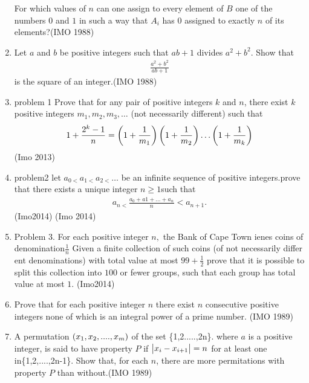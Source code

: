 \begin{enumerate}
                 For which values of $n$ can one assign to every element of $B$ one of the numbers $0$ and $1$ in such a way that $A_i$ has $0$ assigned to exactly $n$ of its elements?\hfill(IMO 1988)
\item Let $a$ and $b$ be positive integers such that $ab + 1$ divides $a^2 + b^2$. Show that 
               \begin{align*} \frac{a^2+b^2}{ab+1} \end{align*} is the square of an integer.\hfill(IMO 1988)
               \item problem 1 Prove that for any pair of positive integers $k$ and $n$, there exist $k$ positive integers $m_1,m_2,m_3,\ldots$
 (not necessarily different) such that
\begin{align}
	1+\frac{2^{k}-1}{n}=\left(1+\frac{1}{m_1}\right)\left(1+\frac{1}{m_2}\right)\ldots\left(1+\frac{1}{m_k}\right)
\end{align}  \hfill(Imo 2013)
 \item problem2 let $a_{0<} a_{1<} a_{2 <} \ldots$ be an infinite sequence of positive integers.prove that there exists a unique integer $n    \geq 1$such that          \begin{align}                                                                                                                                                                             a_{n< }\frac{a_0+a1+\ldots+a_n}{n} < a_{n+1}.                                                                                                                \end{align} \hfill(Imo2014) \hfill(Imo 2014)   
\item Problem 3. For each positive integer $n,$ the Bank of Cape Town ienes coins of denomination$\frac{1}{n}$ Given a finite collection of such coins (of  not  necessarily  differ
    ent  denominations) with total value at most $99 +\frac{1}{2}$ prove that it is possible to split this collection into $100$ or fewer groups, such that each group has total value at most $1$. \hfill(Imo2014)
    \item Prove that for each positive integer $n$ there exist $n$ consecutive positive integers none of which is an integral power of a prime number. \hfill(IMO 1989)

	\item A permutation $\left(x_1,x_2,....,x_m\right)$ of the set \{1,2.....,2n\}. where $a$ is a positive integer, is said to have property $P$ if $\begin{vmatrix}x_i - x_{i+1}\end{vmatrix} = n $ for at least one in\{1,2,....,2n-1\}. Show that, for each $n$, there are more permitations with property $P$ than without.\hfill(IMO 1989)


\end{enumerate}
